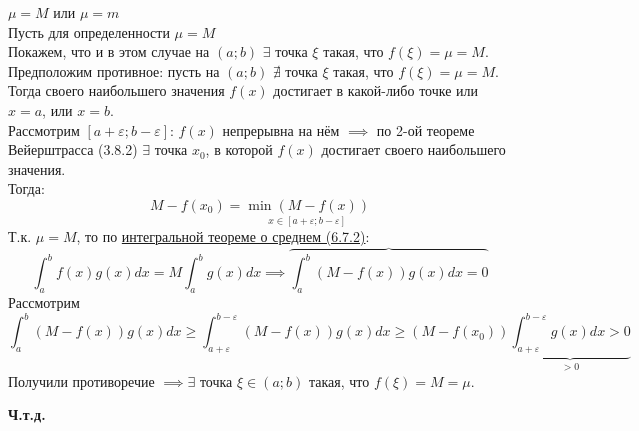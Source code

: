 \documentclass[12pt]{article}
\begin{document}
\begin{adjustwidth}{1.5em}{1.5em}
\begin{adjustwidth}{1.5em}{1.5em}
\begin{enumerate}
                $\mu=M \text{ или } \mu=m$\\
                Пусть для определенности $\mu=M$\\
                Покажем, что и в этом случае на $(a;b)$ $\exists$ точка $\xi$ такая, что $f(\xi)=\mu=M$.\\
                Предположим противное: пусть на $(a;b)$ $\nexists$ точка $\xi$ такая, что $f(\xi)=\mu=M$.\\
                Тогда своего наибольшего значения $f(x)$ достигает в какой-либо точке или $x=a$, или $x=b$.\\
                Рассмотрим $[a+\varepsilon; b-\varepsilon]$: $f(x)$ непрерывна на нём $\implies$ по 2-ой теореме Вейерштрасса (3.8.2) $\exists$ точка $x_0$, в которой $f(x)$ достигает своего наибольшего значения.\\
                Тогда: 
                \[ M-f(x_0)=\underset{x \in [a+\varepsilon; b-\varepsilon]}{\min(M - f(x))} \]
                Т.к. $\mu=M$, то по \hyperref[th:6.7.2]{интегральной теореме о среднем (6.7.2)}: 
                \[ \int_{a}^{b} f(x)g(x)dx=M\int_{a}^{b}g(x)dx \implies \overbrace{\int_{a}^{b}(M-f(x))g(x)dx=0} \]
                Рассмотрим 
                \[ \int_{a}^{b}(M-f(x))g(x)dx\geq\int_{a+\varepsilon}^{b-\varepsilon}(M-f(x))g(x)dx \geq (M-f(x_0)) \underbrace{\int_{a+\varepsilon}^{b-\varepsilon} g(x)dx>0}_{>0} \]
                Получили противоречие $\implies \exists$ точка $\xi \in (a;b)$ такая, что $f(\xi)=M=\mu$.
                \begin{center}
                    \textbf{Ч.т.д.}
                \end{center}
            \end{enumerate}
        \end{adjustwidth}
    \end{adjustwidth}
\end{document}
